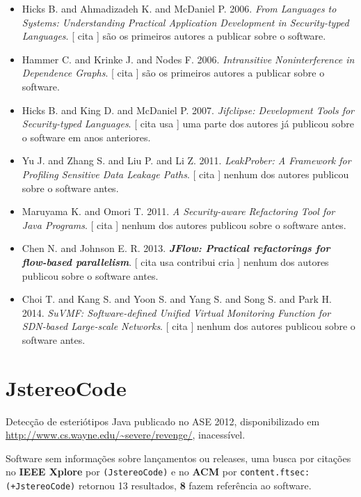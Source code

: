 \begin{itemize}
\item Hicks B. and Ahmadizadeh K. and McDaniel P.
      2006.
        \textit{ From Languages to Systems: Understanding Practical Application Development in Security-typed Languages}.
      [
          cita
      ]
são os primeiros autores a publicar sobre o software.
\item Hammer C. and Krinke J. and Nodes F.
      2006.
        \textit{ Intransitive Noninterference in Dependence Graphs}.
      [
          cita
      ]
são os primeiros autores a publicar sobre o software.
\item Hicks B. and King D. and McDaniel P.
      2007.
        \textit{ Jifclipse: Development Tools for Security-typed Languages}.
      [
          cita
          usa
      ]
uma parte dos autores já publicou sobre o software em anos anteriores.
\item Yu J. and Zhang S. and Liu P. and Li Z.
      2011.
        \textit{ LeakProber: A Framework for Profiling Sensitive Data Leakage Paths}.
      [
          cita
      ]
nenhum dos autores publicou sobre o software antes.
\item Maruyama K. and Omori T.
      2011.
        \textit{ A Security-aware Refactoring Tool for Java Programs}.
      [
          cita
      ]
nenhum dos autores publicou sobre o software antes.
\item Chen N. and Johnson E. R.
      2013.
        \textbf{\textit{ JFlow: Practical refactorings for flow-based parallelism}}.
      [
          cita
          usa
          contribui
          cria
      ]
nenhum dos autores publicou sobre o software antes.
\item Choi T. and Kang S. and Yoon S. and Yang S. and Song S. and Park H.
      2014.
        \textit{ SuVMF: Software-defined Unified Virtual Monitoring Function for SDN-based Large-scale Networks}.
      [
          cita
      ]
nenhum dos autores publicou sobre o software antes.
\end{itemize}
\section{JstereoCode}

Detecção de esteriótipos Java
publicado no ASE 2012,
disponibilizado em \url{http://www.cs.wayne.edu/~severe/revenge/},
inacessível.

Software sem informações sobre lançamentos ou releases,
uma busca por citações no {\bf IEEE Xplore} por
\texttt{(JstereoCode)}
e no {\bf ACM} por
\texttt{content.ftsec:(+JstereoCode)}
retornou
13 resultados,
{\bf 8} fazem referência ao software.

